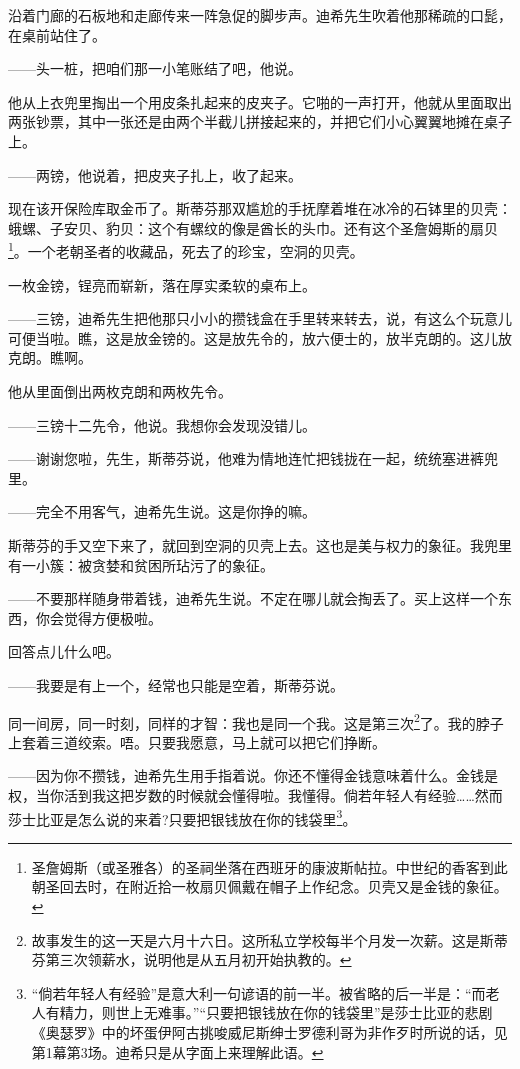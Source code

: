 \par 沿着门廊的石板地和走廊传来一阵急促的脚步声。迪希先生吹着他那稀疏的口髭，在桌前站住了。
\par ——头一桩，把咱们那一小笔账结了吧，他说。
\par 他从上衣兜里掏出一个用皮条扎起来的皮夹子。它啪的一声打开，他就从里面取出两张钞票，其中一张还是由两个半截儿拼接起来的，并把它们小心翼翼地摊在桌子上。
\par ——两镑，他说着，把皮夹子扎上，收了起来。
\par 现在该开保险库取金币了。斯蒂芬那双尴尬的手抚摩着堆在冰冷的石钵里的贝壳：蛾螺、子安贝、豹贝：这个有螺纹的像是酋长的头巾。还有这个圣詹姆斯的扇贝\footnote{圣詹姆斯（或圣雅各）的圣祠坐落在西班牙的康波斯帖拉。中世纪的香客到此朝圣回去时，在附近拾一枚扇贝佩戴在帽子上作纪念。贝壳又是金钱的象征。}。一个老朝圣者的收藏品，死去了的珍宝，空洞的贝壳。
\par 一枚金镑，锃亮而崭新，落在厚实柔软的桌布上。
\par ——三镑，迪希先生把他那只小小的攒钱盒在手里转来转去，说，有这么个玩意儿可便当啦。瞧，这是放金镑的。这是放先令的，放六便士的，放半克朗的。这儿放克朗。瞧啊。
\par 他从里面倒出两枚克朗和两枚先令。
\par ——三镑十二先令，他说。我想你会发现没错儿。
\par ——谢谢您啦，先生，斯蒂芬说，他难为情地连忙把钱拢在一起，统统塞进裤兜里。
\par ——完全不用客气，迪希先生说。这是你挣的嘛。
\par 斯蒂芬的手又空下来了，就回到空洞的贝壳上去。这也是美与权力的象征。我兜里有一小簇：被贪婪和贫困所玷污了的象征。
\par ——不要那样随身带着钱，迪希先生说。不定在哪儿就会掏丢了。买上这样一个东西，你会觉得方便极啦。
\par 回答点儿什么吧。
\par ——我要是有上一个，经常也只能是空着，斯蒂芬说。
\par 同一间房，同一时刻，同样的才智：我也是同一个我。这是第三次\footnote{故事发生的这一天是六月十六日。这所私立学校每半个月发一次薪。这是斯蒂芬第三次领薪水，说明他是从五月初开始执教的。}了。我的脖子上套着三道绞索。唔。只要我愿意，马上就可以把它们挣断。
\par ——因为你不攒钱，迪希先生用手指着说。你还不懂得金钱意味着什么。金钱是权，当你活到我这把岁数的时候就会懂得啦。我懂得。倘若年轻人有经验……然而莎士比亚是怎么说的来着?只要把银钱放在你的钱袋里\footnote{“倘若年轻人有经验”是意大利一句谚语的前一半。被省略的后一半是：“而老人有精力，则世上无难事。”“只要把银钱放在你的钱袋里”是莎士比亚的悲剧《奥瑟罗》中的坏蛋伊阿古挑唆威尼斯绅士罗德利哥为非作歹时所说的话，见第1幕第3场。迪希只是从字面上来理解此语。}。
